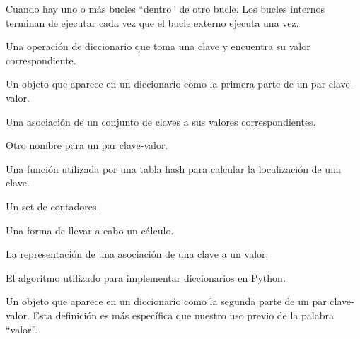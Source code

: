 \begin{description}
\tightlist
\item[bucles anidados]
Cuando hay uno o más bucles ``dentro'' de otro bucle. Los bucles
internos terminan de ejecutar cada vez que el bucle externo ejecuta una
vez.  
\item[búsqueda]
Una operación de diccionario que toma una clave y encuentra su valor
correspondiente. 
\item[clave]
Un objeto que aparece en un diccionario como la primera parte de un par
clave-valor. 
\item[diccionario]
Una asociación de un conjunto de claves a sus valores correspondientes.
\item[elemento]
Otro nombre para un par clave-valor. 
\item[función hash]
Una función utilizada por una tabla hash para calcular la localización
de una clave. 
\item[histograma]
Un set de contadores. 
\item[implementación]
Una forma de llevar a cabo un cálculo. 
\item[par clave-valor]
La representación de una asociación de una clave a un valor.
\item[tabla hash]
El algoritmo utilizado para implementar diccionarios en Python.
\item[valor]
Un objeto que aparece en un diccionario como la segunda parte de un par
clave-valor. Esta definición es más específica que nuestro uso previo de
la palabra ``valor''. 
\end{description}



